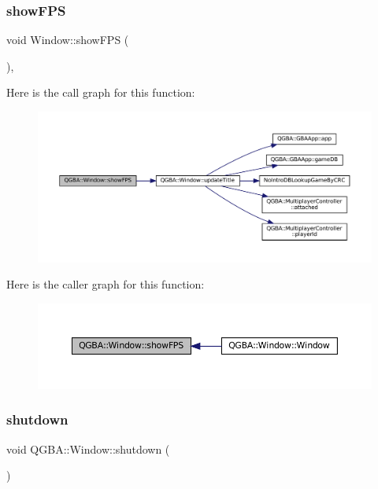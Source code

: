 \subsubsection{\texorpdfstring{show\+F\+PS}{showFPS}}
{\footnotesize\ttfamily void Window\+::show\+F\+PS (\begin{DoxyParamCaption}{ }\end{DoxyParamCaption})\hspace{0.3cm}{\ttfamily [private]}, {\ttfamily [slot]}}

Here is the call graph for this function\+:
\nopagebreak
\begin{figure}[H]
\begin{center}
\leavevmode
\includegraphics[width=350pt]{class_q_g_b_a_1_1_window_ace8436461a769c9d941c8cbcf82cf79f_cgraph}
\end{center}
\end{figure}
Here is the caller graph for this function\+:
\nopagebreak
\begin{figure}[H]
\begin{center}
\leavevmode
\includegraphics[width=350pt]{class_q_g_b_a_1_1_window_ace8436461a769c9d941c8cbcf82cf79f_icgraph}
\end{center}
\end{figure}
\mbox{\label{class_q_g_b_a_1_1_window_a76ef9d12e6314062232114b5c1f0fa82}} 
\subsubsection{\texorpdfstring{shutdown}{shutdown}}
{\footnotesize\ttfamily void Q\+G\+B\+A\+::\+Window\+::shutdown (\begin{DoxyParamCaption}{ }\end{DoxyParamCaption})\hspace{0.3cm}{\ttfamily [signal]}}

